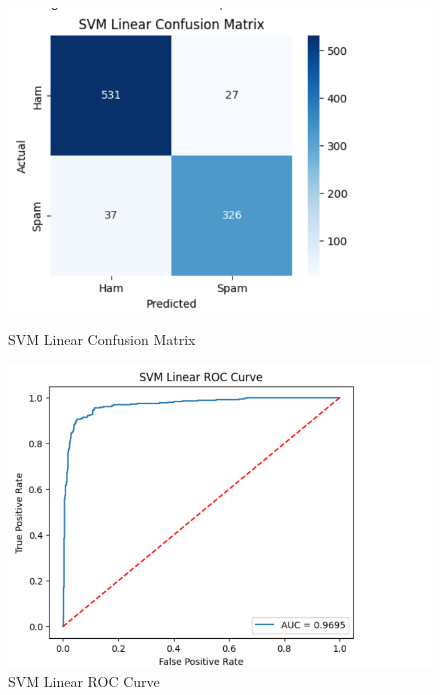 \documentclass[12pt]{article}
\begin{document}
\begin{figure}[H]
\centering
\begin{minipage}{0.45\textwidth}
\centering
\includegraphics[width=\linewidth]{20.png}
\caption{SVM Linear Confusion Matrix}
\end{minipage}
\hfill
\begin{minipage}{0.45\textwidth}
\centering
\includegraphics[width=\linewidth]{21.png}
\caption{SVM Linear ROC Curve}
\end{minipage}
\end{figure}
\end{document}
